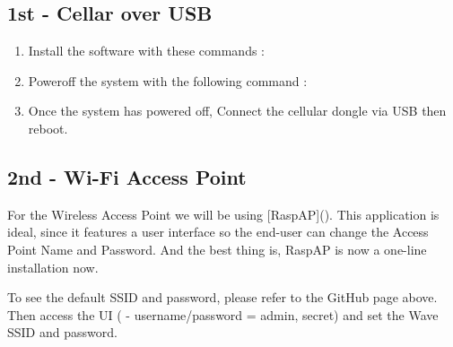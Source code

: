 \documentclass[letterpaper,10pt,openany,oneside,english]{sphinxmanual}
\begin{document}
\subsection{1st - Cellar over USB}
\label{\detokenize{manual_build:st-cellar-over-usb}}\begin{enumerate}
\item {} 
Install the software with these commands :
\begin{quote}


\end{quote}

\item {} 
Poweroff the system with the following command :
\begin{quote}

\end{quote}

\item {} 
Once the system has powered off, Connect the cellular dongle via USB then reboot.

\end{enumerate}


\subsection{2nd - Wi-Fi Access Point}
\label{\detokenize{manual_build:nd-wi-fi-access-point}}
For the Wireless Access Point we will be using {[}RaspAP{]}().
This application is ideal, since it features a user interface so the end-user can change the Access Point Name and Password.
And the best thing is, RaspAP is now a one-line installation now.
\begin{quote}

\end{quote}

To see the default SSID and password, please refer to the GitHub page above.
Then access the UI (  - username/password = admin, secret) and set the Wave SSID and password.
\begin{quote}


\end{quote}
\end{document}
